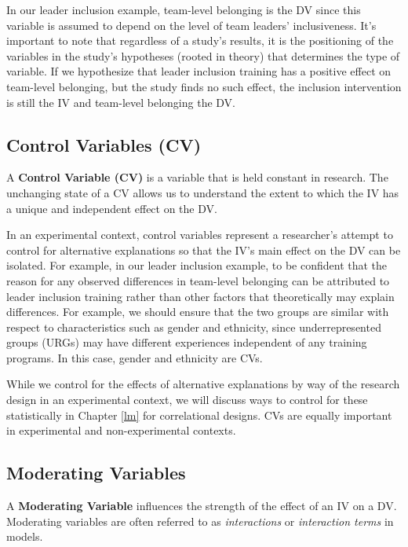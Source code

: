 \documentclass[]{book}
\begin{document}
In our leader inclusion example, team-level belonging is the DV since this variable is assumed to depend on the level of team leaders' inclusiveness. It's important to note that regardless of a study's results, it is the positioning of the variables in the study's hypotheses (rooted in theory) that determines the type of variable. If we hypothesize that leader inclusion training has a positive effect on team-level belonging, but the study finds no such effect, the inclusion intervention is still the IV and team-level belonging the DV.

\hypertarget{control-variables-cv}{%
\subsection{Control Variables (CV)}\label{control-variables-cv}}

A \textbf{Control Variable (CV)} is a variable that is held constant in research. The unchanging state of a CV allows us to understand the extent to which the IV has a unique and independent effect on the DV.

In an experimental context, control variables represent a researcher's attempt to control for alternative explanations so that the IV's main effect on the DV can be isolated. For example, in our leader inclusion example, to be confident that the reason for any observed differences in team-level belonging can be attributed to leader inclusion training rather than other factors that theoretically may explain differences. For example, we should ensure that the two groups are similar with respect to characteristics such as gender and ethnicity, since underrepresented groups (URGs) may have different experiences independent of any training programs. In this case, gender and ethnicity are CVs.

While we control for the effects of alternative explanations by way of the research design in an experimental context, we will discuss ways to control for these statistically in Chapter \ref{lm} for correlational designs. CVs are equally important in experimental and non-experimental contexts.

\hypertarget{moderating-variables}{%
\subsection{Moderating Variables}\label{moderating-variables}}

A \textbf{Moderating Variable} influences the strength of the effect of an IV on a DV. Moderating variables are often referred to as \emph{interactions} or \emph{interaction terms} in models.
\end{document}
